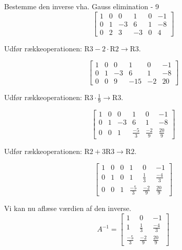 \documentclass{article}
\begin{document}
\begin{exercise}{Bestemme den inverse vha. Gauss elimination - 9}
	\hint
	\[
	\left[\begin{array}{ccc|ccc}
	1 & 0 & 0 & 1 & 0 & -1 \\ 
	0 & 1 & -3 & 6 & 1 & -8 \\
	0 & 2 & 3 & -3 & 0 & 4 
	\end{array} \right]
	\]
	
	\hint
	Udfør rækkeoperationen: $\text{R3} - 2 \cdot  \text{R2} \to \text{R3}$.
	
	\hint
	\[
	\left[\begin{array}{ccc|ccc}
	1 & 0 & 0 & 1 & 0 & -1 \\ 
	0 & 1 & -3 & 6 & 1 & -8 \\
	0 & 0 & 9 & -15 & -2 & 20 
	\end{array} \right]
	\]
	
	\hint
	Udfør rækkeoperationen: $\text{R3} \cdot \frac{1}{9} \to \text{R3}$.
	
	\hint
	\[
	\left[\begin{array}{ccc|ccc}
	1 & 0 & 0 & 1 & 0 & -1 \\ 
	0 & 1 & -3 & 6 & 1 & -8 \\
	0 & 0 & 1 & \frac{-5}{3} & \frac{-2}{9} & \frac{20}{9} 
	\end{array} \right]
	\]
	
	\hint
	Udfør rækkeoperationen: $\text{R2} + 3 \text{R3} \to \text{R2}$.
	
	\hint
	\[
	\left[\begin{array}{ccc|ccc}
	1 & 0 & 0 & 1 & 0 & -1 \\ 
	0 & 1 & 0 & 1 & \frac{1}{3} & \frac{-4}{3} \\
	0 & 0 & 1 & \frac{-5}{3} & \frac{-2}{9} & \frac{20}{9} 
	\end{array} \right]
	\]
	
	
	\hint
	Vi kan nu aflæse værdien af den inverse.
	\[
	A^{-1} = \left[\begin{array}{ccc}
	1 & 0 & -1 \\ 
	1 & \frac{1}{3} & \frac{-4}{3} \\
	\frac{-5}{3} & \frac{-2}{9} & \frac{20}{9} 
	\end{array} \right]
	\]
	
	
\end{exercise}
\end{document}
